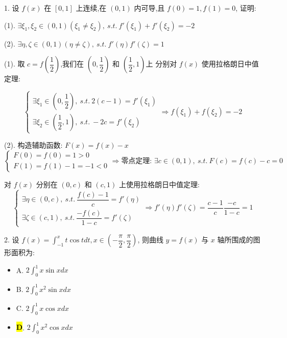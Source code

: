 1. 设 $f(x)$ 在 $[0,1]$ 上连续,在 $(0,1)$ 内可导,且 $f(0)=1,f(1)=0$, 证明:

(1). $\exists \xi_{1},\xi_{2}\in(0,1)(\xi_{1}\neq \xi_{2}),\ s.t.\ f'(\xi_{1})+f'(\xi_{2})=-2$

(2). $\exists \eta,\zeta\in(0,1)(\eta\neq \zeta),\ s.t.\ f'(\eta)f'(\zeta)=1$

\begin{solution}

	(1). 取 $c=f(\dfrac{1}{2})$,我们在 $(0,\dfrac{1}{2})$ 和 $(\dfrac{1}{2},1)$上
	分别对 $f(x)$ 使用拉格朗日中值定理:  
	
	$$\begin{cases}
		\exists \xi_{1}\in(0,\dfrac{1}{2}),\ s.t.\ 2(c-1) = f'(\xi_{1}) \\
		\exists \xi_{2}\in(\dfrac{1}{2},1),\ s.t.\ -2c = f'(\xi_{2})
	\end{cases}
	\Rightarrow f(\xi_{1})+f(\xi_{2})=-2$$
	
	(2). 构造辅助函数: $F(x)=f(x)-x$  
	$$\begin{cases}
		F(0) = f(0) = 1 > 0 \\
		F(1) = f(1) - 1 = -1 < 0
	\end{cases}\Rightarrow \text{零点定理: }
	\exists c\in(0,1),\ s.t.\ F(c) = f(c) - c = 0$$
	
	对 $f(x)$ 分别在 $(0,c)$ 和 $(c,1)$ 上使用拉格朗日中值定理:  
	$$\begin{cases}
		\exists\eta\in(0,c),\ s.t.\ \dfrac{f(c)-1}{c} = f'(\eta)\\
		\exists\zeta\in(c,1),\ s.t.\ \dfrac{-f(c)}{1-c} = f'(\zeta)
	\end{cases}\Rightarrow 
	f'(\eta)f'(\zeta) = \dfrac{c-1}{c}\dfrac{-c}{1-c} = 1$$
\end{solution}


2. 设 $\displaystyle{f(x)=\int_{-1}^{x}t\cos tdt,x\in(-\dfrac{\pi}{2},\dfrac{\pi}{2})}$,
则曲线 $y=f(x)$ 与 $x$ 轴所围成的图形面积为:  
\begin{itemize}
	\item A. $2\int_{0}^{1}x\sin xdx$
	\item B. $2\int_{0}^{1}x^2\sin xdx$
	\item C. $2\int_{0}^{1}x\cos xdx$
	\item \hl{\textbf{D}}. $2\int_{0}^{1}x^2\cos xdx$
\end{itemize}

